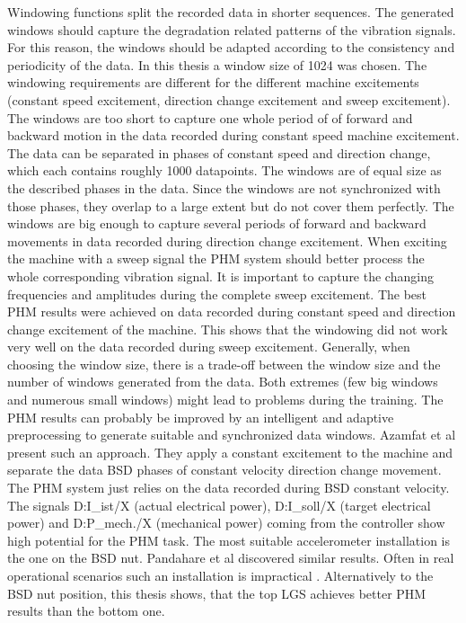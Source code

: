 Windowing functions split the recorded data in shorter sequences. The generated windows should capture the degradation related patterns of the vibration signals. For this reason, the windows should be adapted according to the consistency and periodicity of the data. In this thesis a window size of 1024 was chosen. The windowing requirements are different for the different machine excitements (constant speed excitement, direction change excitement and sweep excitement). The windows are too short to capture one whole period of of forward and backward motion in the data recorded during constant speed machine excitement. The data can be separated in phases of constant speed and direction change, which each contains roughly 1000 datapoints. The windows are of equal size as the described phases in the data. Since the windows are not synchronized with those phases, they overlap to a large extent but do not cover them perfectly. The windows are big enough to capture several periods of forward and backward movements in data recorded during direction change excitement. When exciting the machine with a sweep signal the PHM system should better process the whole corresponding vibration signal. It is important to capture the changing frequencies and amplitudes during the complete sweep excitement. The best PHM results were achieved on data recorded during constant speed and  direction change excitement of the machine. This shows that the windowing did not work very well on the data recorded during sweep excitement. Generally, when choosing the window size, there is a trade-off between the window size and the number of windows generated from the data. Both extremes (few big windows and numerous small windows) might lead to problems during the training. The PHM results can probably be improved by an intelligent and adaptive preprocessing to generate suitable and synchronized data windows. Azamfat et al \cite{AZAMFAR2020103932} present such an approach. They apply a constant excitement to the machine and separate the data BSD phases of constant velocity direction change movement. The PHM system just relies on the data recorded during BSD constant velocity. The signals D:I\_ist/X (actual electrical power), D:I\_soll/X (target electrical power) and D:P\_mech./X (mechanical power) coming from the controller show high potential for the PHM task. The most suitable accelerometer installation is the one on the BSD nut. Pandahare et al \cite{Pandhare2021} discovered similar results. Often in real operational scenarios such an installation is impractical \cite{Pandhare2021}. Alternatively to the BSD nut position, this thesis shows, that the top LGS achieves better PHM results than the bottom one.

